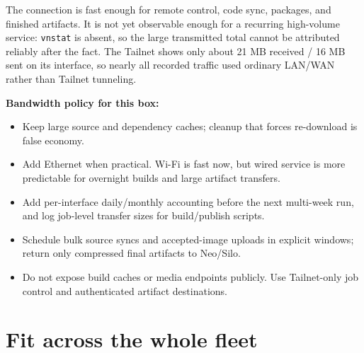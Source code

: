 \documentclass[11pt,letterpaper]{article}
\newcommand{\mono}[1]{\texttt{#1}}
\begin{document}
The connection is fast enough for remote control, code sync, packages, and finished artifacts. It is not yet observable enough for a recurring high-volume service: \mono{vnstat} is absent, so the large transmitted total cannot be attributed reliably after the fact. The Tailnet shows only about 21 MB received / 16 MB sent on its interface, so nearly all recorded traffic used ordinary LAN/WAN rather than Tailnet tunneling.

\textbf{Bandwidth policy for this box:}
\begin{itemize}
  \item Keep large source and dependency caches; cleanup that forces re-download is false economy.
  \item Add Ethernet when practical. Wi-Fi is fast now, but wired service is more predictable for overnight builds and large artifact transfers.
  \item Add per-interface daily/monthly accounting before the next multi-week run, and log job-level transfer sizes for build/publish scripts.
  \item Schedule bulk source syncs and accepted-image uploads in explicit windows; return only compressed final artifacts to Neo/Silo.
  \item Do not expose build caches or media endpoints publicly. Use Tailnet-only job control and authenticated artifact destinations.
\end{itemize}

\section{Fit across the whole fleet}
\end{document}
